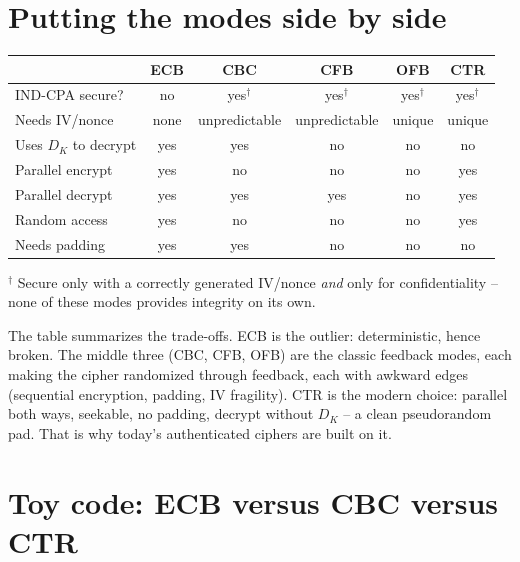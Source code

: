 \section{Putting the modes side by side}

\begin{center}
\renewcommand{\arraystretch}{1.3}
\begin{tabular}{@{}lccccc@{}}
\toprule
 & \textbf{ECB} & \textbf{CBC} & \textbf{CFB} & \textbf{OFB} & \textbf{CTR}\\
\midrule
IND-CPA secure? & no & yes$^\dagger$ & yes$^\dagger$ & yes$^\dagger$ & yes$^\dagger$\\
Needs IV/nonce & none & unpredictable & unpredictable & unique & unique\\
Uses $D_K$ to decrypt & yes & yes & no & no & no\\
Parallel encrypt & yes & no & no & no & yes\\
Parallel decrypt & yes & yes & yes & no & yes\\
Random access & yes & no & no & no & yes\\
Needs padding & yes & yes & no & no & no\\
\bottomrule
\end{tabular}
\end{center}

\noindent $^\dagger$ Secure only with a correctly generated IV/nonce \emph{and} only for confidentiality -- none of these modes provides integrity on its own.

\begin{intuitionbox}
The table summarizes the trade-offs. ECB is the outlier: deterministic, hence broken. The middle three (CBC, CFB, OFB) are the classic feedback modes, each making the cipher randomized through feedback, each with awkward edges (sequential encryption, padding, IV fragility). CTR is the modern choice: parallel both ways, seekable, no padding, decrypt without $D_K$ -- a clean pseudorandom pad. That is why today's authenticated ciphers are built on it.
\end{intuitionbox}

\section{Toy code: ECB versus CBC versus CTR}


